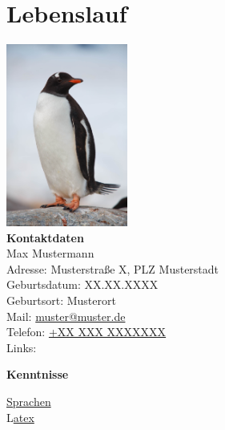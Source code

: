 \chapter{Lebenslauf}\vspace{1cm}
\begin{vwcol}[widths={0.4,0.6}, rule=0.4pt, sep=.5em, indent=.5em]
  \begin{centering}
  \includegraphics[width=4cm]{./Profile_Pic.jpg}\\
  \Large\textbf{Kontaktdaten}\\
  \normalsize
  Max Mustermann\\
  Adresse: Musterstraße X, PLZ Musterstadt\\
  Geburtsdatum: XX.XX.XXXX\\
  Geburtsort: Musterort\\
  Mail: \href{mailto:muster@muster.de}{muster@muster.de}\\
  Telefon: \href{tel:+XXXXXXXXXX}{+XX XXX XXXXXXX}\\
  Links: \LARGE \hspace{0.2 cm} \href{https://www.linkedin.com/muster}{\faLinkedin} \hspace{0.5 cm}\href{https://github.com/muster}{\faGithub} \hspace{0.5 cm}\href{https://www.instagram.com/muster/}{\faInstagram}\\\vspace{0.8cm}

  \Large\textbf{Kenntnisse}\\
  \end{centering}  \normalsize
  \hyperref[<reference>]{Sprachen}\\
  L\href{<reference_url>}{atex}\\

  \vspace{0.8cm}


\end{vwcol}
